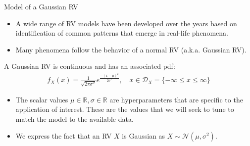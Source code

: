 \documentclass[9pt]{beamer}
\begin{document}
%
\begin{frame}{Model of a Gaussian RV}

\begin{itemize}

\item A wide range of RV models have been developed over the years based on identification of common patterns that emerge in real-life phenomena. 

\item Many phenomena follow the behavior of a normal RV (a.k.a. Gaussian RV). 

\end{itemize}

\begin{block}{}
A Gaussian RV is continuous and has an associated pdf:
\begin{align*}
f_X(x)=\frac{1}{\sqrt{2\pi\sigma^2}}e^{\frac{-(x-\mu)^2}{2\sigma^2}}, \quad  x\in \mathcal{D}_X=\{-\infty\leq x\leq \infty\}
\end{align*}
\end{block}
\begin{itemize}
\item The scalar values $\mu\in \mathbb{R},\sigma\in \mathbb{R}$ are hyperparameters that are specific to the application of interest. These are the values that we will seek to tune to match the model to the available data. 

\item We express the fact that an RV $X$ is Gaussian as $X\sim \mathcal{N}(\mu,\sigma^2)$. 

\end{itemize}

\end{frame}
\end{document}
